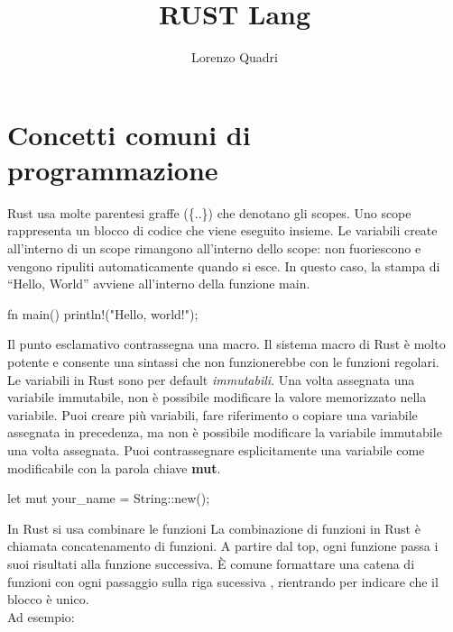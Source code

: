 \documentclass[11pt,a4paper]{article}
\author{Lorenzo Quadri}
\title{RUST Lang}
\begin{document}
\maketitle

\section{Concetti comuni di programmazione}

Rust usa molte parentesi graffe (\{..\}) che denotano gli scopes. Uno scope rappresenta un blocco di codice che viene eseguito insieme. Le variabili create all'interno di un scope rimangono all'interno dello scope: non fuoriescono e vengono ripuliti automaticamente quando si esce. In questo caso, la stampa di “Hello, World” avviene all'interno della funzione main.

\begin{rust}
fn main() {
	println!("Hello, world!");
}
\end{rust}
Il punto esclamativo contrassegna una macro. Il sistema macro di Rust è molto potente e consente una sintassi che non funzionerebbe con le funzioni regolari.\\
Le variabili in Rust sono per default \textit{immutabili}. Una volta assegnata una variabile immutabile, non è possibile modificare la valore memorizzato nella variabile. Puoi creare più variabili, fare riferimento o copiare una variabile assegnata in precedenza, ma non è possibile modificare la variabile immutabile una volta assegnata. Puoi contrassegnare esplicitamente una variabile come modificabile con la parola chiave \textbf{mut}.\\

\begin{rust}
let mut your_name = String::new();
\end{rust}

In Rust si usa combinare le funzioni 
La combinazione di funzioni in Rust è chiamata concatenamento di funzioni. A partire dal top, ogni funzione passa i suoi risultati alla funzione successiva. È comune formattare una catena di funzioni con ogni passaggio sulla riga sucessiva , rientrando per indicare che il blocco è unico.\\
Ad esempio:
\end{document}
